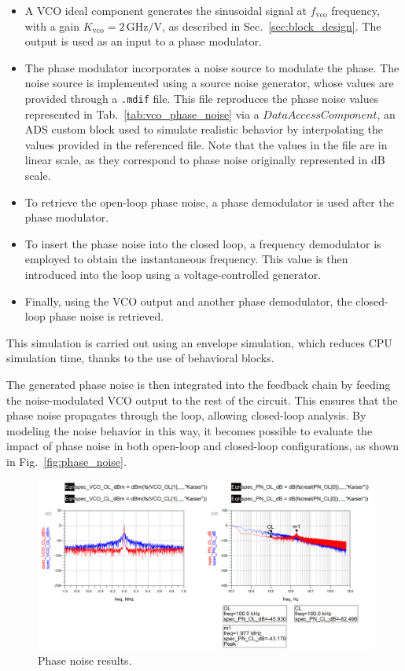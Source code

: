 \documentclass[lettersize,journal]{IEEEtran}
\begin{document}
\begin{itemize}
    \item A VCO ideal component generates the sinusoidal signal at \(f_{\text{vco}}\) frequency, with a gain \(K_{\text{vco}} = 2 \, \text{GHz/V}\), as described in Sec.~\ref{sec:block_design}. The output is used as an input to a phase modulator.
    \item The phase modulator incorporates a noise source to modulate the phase. The noise source is implemented using a source noise generator, whose values are provided through a \texttt{.mdif} file. This file reproduces the phase noise values represented in Tab.~\ref{tab:vco_phase_noise} via a \(DataAccessComponent\), an ADS custom block used to simulate realistic behavior by interpolating the values provided in the referenced file. Note that the values in the file are in linear scale, as they correspond to phase noise originally represented in dB scale.
    \item To retrieve the open-loop phase noise, a phase demodulator is used after the phase modulator.
    \item To insert the phase noise into the closed loop, a frequency demodulator is employed to obtain the instantaneous frequency. This value is then introduced into the loop using a voltage-controlled generator.
    \item Finally, using the VCO output and another phase demodulator, the closed-loop phase noise is retrieved.
\end{itemize}

This simulation is carried out using an envelope simulation, which reduces CPU simulation time, thanks to the use of behavioral blocks.

The generated phase noise is then integrated into the feedback chain by feeding the noise-modulated VCO output to the rest of the circuit. This ensures that the phase noise propagates through the loop, allowing closed-loop analysis. By modeling the noise behavior in this way, it becomes possible to evaluate the impact of phase noise in both open-loop and closed-loop configurations, as shown in Fig.~\ref{fig:phase_noise}.

\begin{figure}[!ht]
    \centering
    \includegraphics[width=1\linewidth]{images/ads_results/phase_noise/phase_noise_results.png}
    \caption{Phase noise results.}
    \label{fig:phase_noise_results}
\end{figure}
\end{document}
